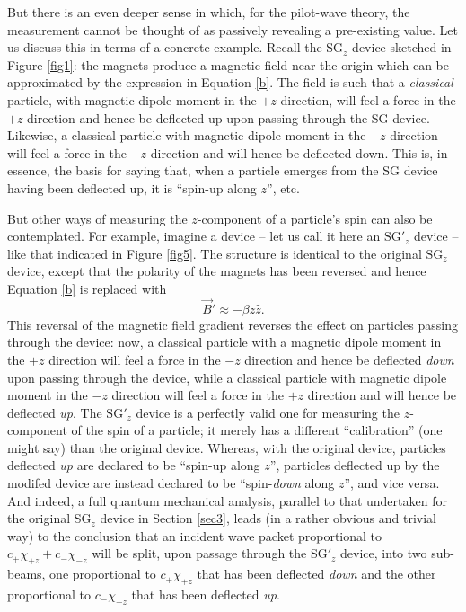 \documentclass[aps,prc,onecolumn,letterpaper,floatfix,12pt]{revtex4}
\begin{document}
But there is an even deeper sense in which, for the
pilot-wave theory, the measurement cannot be thought of as passively 
revealing a
pre-existing value.  Let us discuss this in terms of a concrete
example.  Recall the SG$_z$ device sketched in Figure \ref{fig1}:  the
magnets produce a magnetic field near the origin which can be
approximated by the expression in Equation \eqref{b}.  The field is
such that a \emph{classical} particle, with magnetic dipole moment in
the $+z$ direction, will feel a force in the $+z$ direction and hence
be deflected up upon passing through the SG device.  Likewise, a
classical particle with magnetic dipole moment in the $-z$ direction
will feel a force in the $-z$ direction and will hence be deflected
down.  This is, in essence, the basis for saying that, when a particle
emerges from the SG device having been deflected up, it is ``spin-up
along $z$'', etc.  

But other ways of measuring the $z$-component of a particle's spin can
also be contemplated.  For example, imagine a device -- let us call it
here an $\text{SG}'_z$ device -- like that indicated in Figure
\ref{fig5}.  The structure is identical to the original $\text{SG}_z$
device, except that the polarity of the magnets has been reversed and
hence Equation \eqref{b} is replaced with
\begin{equation}
\vec{B}' \approx - \beta z \hat{z}.
\end{equation}
This reversal of the magnetic field gradient reverses the effect on
particles passing through the device:
now, a classical particle with a magnetic dipole
moment in the $+z$ direction will feel a force in the $-z$ direction
and hence be deflected \emph{down} upon passing through the device,
while a classical particle with magnetic dipole moment in the $-z$
direction will feel a force in the $+z$ direction and will hence be
deflected \emph{up}.  The $\text{SG}'_z$ device is a perfectly valid
one for measuring the $z$-component of the spin of a particle; it
merely has a different ``calibration'' (one might say) than the
original device.  Whereas, with the original device, particles
deflected \emph{up} are declared to be ``spin-up along $z$'',
particles deflected up by the modifed device are instead declared to
be ``spin-\emph{down} along $z$'', and vice versa.  And indeed, a full
quantum mechanical analysis, parallel to that undertaken for the
original $\text{SG}_z$ device in Section \ref{sec3}, leads (in a
rather obvious and trivial way) to the conclusion that an incident
wave packet proportional to $c_+ \chi_{+z} + c_- \chi_{-z}$ will be split,
upon passage through the $\text{SG}'_z$ device, into two sub-beams,
one proportional to $c_+ \chi_{+z}$ that has been deflected \emph{down}
and the other proportional to $c_- \chi_{-z}$ that has been deflected
\emph{up}.  
\end{document}

